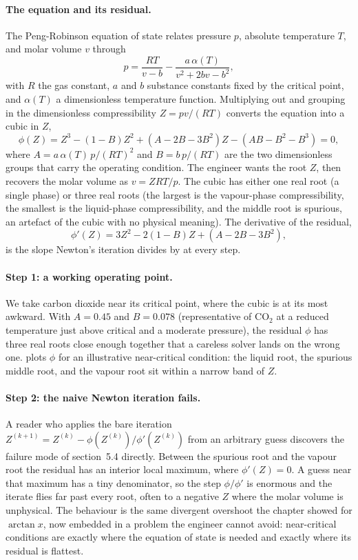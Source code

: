 \paragraph{The equation and its residual.}
The Peng-Robinson equation of state relates pressure $p$, absolute
temperature $T$, and molar volume $v$ through
\[
p = \frac{R T}{v - b} - \frac{a\,\alpha(T)}{v^{2} + 2 b v - b^{2}},
\]
with $R$ the gas constant, $a$ and $b$ substance constants fixed by the
critical point, and $\alpha(T)$ a dimensionless temperature function.
Multiplying out and grouping in the dimensionless compressibility
$Z = p v /(R T)$ converts the equation into a cubic in $Z$,
\[
\phi(Z) = Z^{3} - (1 - B) Z^{2} + \left(A - 2 B - 3 B^{2}\right) Z -
\left(A B - B^{2} - B^{3}\right) = 0,
\]
where $A = a\,\alpha(T)\, p /(R T)^{2}$ and $B = b\, p /(R T)$ are the
two dimensionless groups that carry the operating condition. The
engineer wants the root $Z$, then recovers the molar volume as
$v = Z R T / p$. The cubic has either one real root (a single phase) or
three real roots (the largest is the vapour-phase compressibility, the
smallest is the liquid-phase compressibility, and the middle root is
spurious, an artefact of the cubic with no physical meaning). The
derivative of the residual,
\[
\phi'(Z) = 3 Z^{2} - 2 (1 - B) Z + \left(A - 2 B - 3 B^{2}\right),
\]
is the slope Newton's iteration divides by at every step.

\paragraph{Step 1: a working operating point.}
We take carbon dioxide near its critical point, where the cubic is at
its most awkward. With $A = 0.45$ and $B = 0.078$ (representative of
$\mathrm{CO_{2}}$ at a reduced temperature just above critical and a
moderate pressure), the residual $\phi$ has three real roots close
enough together that a careless solver lands on the wrong one.
 plots $\phi$ for an illustrative
near-critical condition: the liquid root, the spurious middle root, and
the vapour root sit within a narrow band of $Z$.



\paragraph{Step 2: the naive Newton iteration fails.}
A reader who applies the bare iteration $Z^{(k+1)} = Z^{(k)} -
\phi(Z^{(k)})/\phi'(Z^{(k)})$ from an arbitrary guess discovers the
failure mode of section~5.4 directly. Between the spurious root and the
vapour root the residual has an interior local maximum, where
$\phi'(Z) = 0$. A guess near that maximum has a tiny denominator, so
the step $\phi/\phi'$ is enormous and the iterate flies far past every
root, often to a negative $Z$ where the molar volume is unphysical. The
behaviour is the same divergent overshoot the chapter showed for
$\arctan x$, now embedded in a problem the engineer cannot avoid:
near-critical conditions are exactly where the equation of state is
needed and exactly where its residual is flattest.


